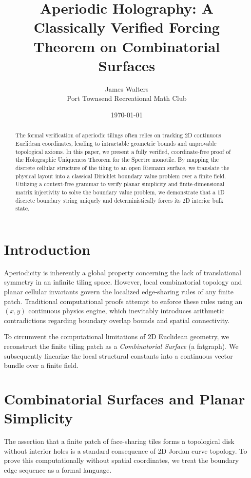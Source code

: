 \documentclass[11pt, letterpaper]{article}
\title{\textbf{Aperiodic Holography: A Classically Verified Forcing Theorem on Combinatorial Surfaces}}
\author{James Walters \\ Port Townsend Recreational Math Club}
\date{\today}
\theoremstyle{definition}
\theoremstyle{plain}
\begin{document}
\maketitle

\begin{abstract}
The formal verification of aperiodic tilings often relies on tracking 2D continuous Euclidean coordinates, leading to intractable geometric bounds and unprovable topological axioms. In this paper, we present a fully verified, coordinate-free proof of the Holographic Uniqueness Theorem for the Spectre monotile. By mapping the discrete cellular structure of the tiling to an open Riemann surface, we translate the physical layout into a classical Dirichlet boundary value problem over a finite field. Utilizing a context-free grammar to verify planar simplicity and finite-dimensional matrix injectivity to solve the boundary value problem, we demonstrate that a 1D discrete boundary string uniquely and deterministically forces its 2D interior bulk state.
\end{abstract}

\section{Introduction}
Aperiodicity is inherently a global property concerning the lack of translational symmetry in an infinite tiling space. However, local combinatorial topology and planar cellular invariants govern the localized edge-sharing rules of any finite patch. Traditional computational proofs attempt to enforce these rules using an $(x,y)$ continuous physics engine, which inevitably introduces arithmetic contradictions regarding boundary overlap bounds and spatial connectivity.

To circumvent the computational limitations of 2D Euclidean geometry, we reconstruct the finite tiling patch as a \textit{Combinatorial Surface} (a fatgraph). We subsequently linearize the local structural constants into a continuous vector bundle over a finite field.

\section{Combinatorial Surfaces and Planar Simplicity}
The assertion that a finite patch of face-sharing tiles forms a topological disk without interior holes is a standard consequence of 2D Jordan curve topology. To prove this computationally without spatial coordinates, we treat the boundary edge sequence as a formal language.
\end{document}
